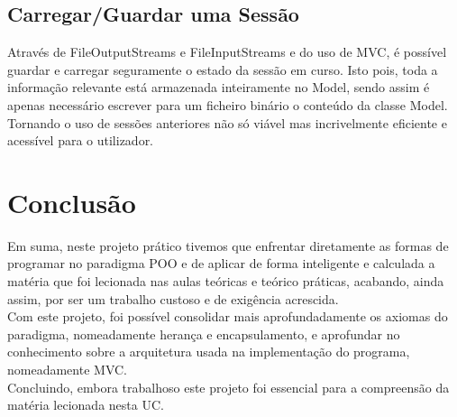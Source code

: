 \documentclass[10pt, a4paper]{article}
\begin{document}
\subsection{Carregar/Guardar uma Sessão}
        Através de FileOutputStreams e FileInputStreams e do uso de MVC, é possível guardar e carregar seguramente o estado da sessão em curso.
        Isto pois, toda a informação relevante está armazenada inteiramente no Model, sendo assim é apenas necessário escrever para um ficheiro binário o
        conteúdo da classe Model. Tornando o uso de sessões anteriores não só viável mas incrivelmente eficiente e acessível para o utilizador.
\subsection{}



\newpage
\section{Conclusão}
        Em suma, neste projeto prático tivemos que enfrentar diretamente as formas de programar no paradigma POO e de aplicar
        de forma inteligente e calculada a matéria que foi lecionada nas aulas teóricas e teórico práticas, acabando, ainda assim, por ser um trabalho custoso
        e de exigência acrescida. \\
        Com este projeto, foi possível consolidar mais aprofundadamente os axiomas do paradigma, nomeadamente herança e encapsulamento, e aprofundar no
        conhecimento sobre a arquitetura usada na implementação do programa, nomeadamente MVC.\@ \\
        Concluindo, embora trabalhoso este projeto foi essencial para a compreensão da matéria lecionada nesta UC.
\end{document}
